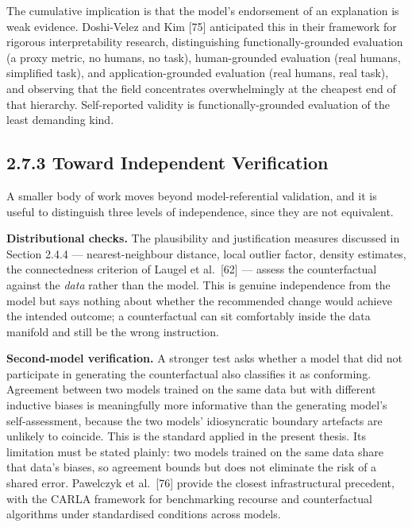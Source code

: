 The cumulative implication is that the model's endorsement of an explanation is weak evidence. Doshi-Velez and Kim {[}75{]} anticipated this in their framework for rigorous interpretability research, distinguishing functionally-grounded evaluation (a proxy metric, no humans, no task), human-grounded evaluation (real humans, simplified task), and application-grounded evaluation (real humans, real task), and observing that the field concentrates overwhelmingly at the cheapest end of that hierarchy. Self-reported validity is functionally-grounded evaluation of the least demanding kind.

\hypertarget{toward-independent-verification}{%
\subsection{2.7.3 Toward Independent Verification}\label{toward-independent-verification}}

A smaller body of work moves beyond model-referential validation, and it is useful to distinguish three levels of independence, since they are not equivalent.

\textbf{Distributional checks.} The plausibility and justification measures discussed in Section 2.4.4 --- nearest-neighbour distance, local outlier factor, density estimates, the connectedness criterion of Laugel et al.~{[}62{]} --- assess the counterfactual against the \emph{data} rather than the model. This is genuine independence from the model but says nothing about whether the recommended change would achieve the intended outcome; a counterfactual can sit comfortably inside the data manifold and still be the wrong instruction.

\textbf{Second-model verification.} A stronger test asks whether a model that did not participate in generating the counterfactual also classifies it as conforming. Agreement between two models trained on the same data but with different inductive biases is meaningfully more informative than the generating model's self-assessment, because the two models' idiosyncratic boundary artefacts are unlikely to coincide. This is the standard applied in the present thesis. Its limitation must be stated plainly: two models trained on the same data share that data's biases, so agreement bounds but does not eliminate the risk of a shared error. Pawelczyk et al.~{[}76{]} provide the closest infrastructural precedent, with the CARLA framework for benchmarking recourse and counterfactual algorithms under standardised conditions across models.

